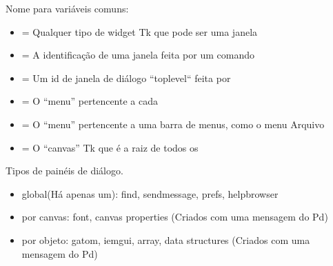 Nome para variáveis comuns:

\begin{itemize}
   \item {}     = Qualquer tipo de widget Tk que pode ser uma janela
   \item {} = A identificação de uma janela feita por um comando 
   \item {}    = Um id de janela de diálogo ``toplevel`` feita por 
   \item {}    = O ``menu'' pertencente a cada 
   \item {}     = O ``menu'' pertencente a uma barra de menus, como o menu Arquivo
   \item {}   = O ``canvas'' Tk que é a raiz de todos os \patches
\end{itemize}

Tipos de painéis de diálogo.

\begin{itemize}
   \item global(Há apenas um):   find, sendmessage, prefs, helpbrowser
   \item por canvas:          font, canvas properties (Criados com uma mensagem do Pd)
   \item por objeto:          gatom, iemgui, array, data structures (Criados com uma mensagem do Pd)
\end{itemize}

\begin{comment}
O Pure Data permite que vários textos da sua GUI sejam internacionalizados, ou seja,
traduzidos dependendo do idioma do sistema operacional.
Para garantir que um texto seja traduzido utilizamos o mesmo 

\begin{lstlisting}
[_ "About Pd"]
\end{lstlisting}
\end{comment}
